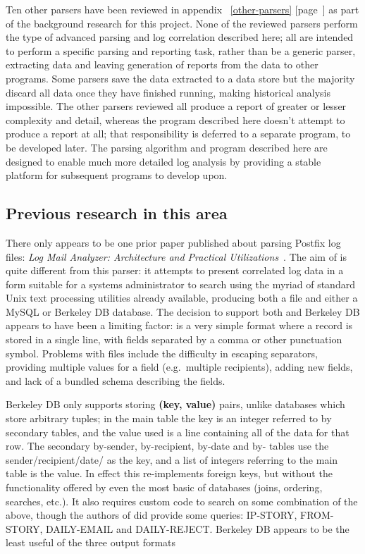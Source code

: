 \documentclass[a4paper,12pt,draft]{article}
\newcommand{\refwithpage}[1]{%
    \empty{}\ref{#1} [page~\pageref{#1}]%
}
\begin{document}
Ten other parsers have been reviewed in
appendix~\refwithpage{other-parsers} as part of the background research for
this project.  None of the reviewed parsers perform the type of advanced
parsing and log correlation described here; all are intended to perform a
specific parsing and reporting task, rather than be a generic parser,
extracting data and leaving generation of reports from the data to other
programs.  Some parsers save the data extracted to a data store but the
majority discard all data once they have finished running, making
historical analysis impossible.  The other parsers reviewed all produce a
report of greater or lesser complexity and detail, whereas the program
described here doesn't attempt to produce a report at all; that
responsibility is deferred to a separate program, to be developed later.
The parsing algorithm and program described here are designed to enable
much more detailed log analysis by providing a stable platform for
subsequent programs to develop upon.



\subsection{Previous research in this area}

\label{prior art}

There only appears to be one prior paper published about parsing Postfix
log files: \textit{Log Mail Analyzer: Architecture and Practical
Utilizations\/}~\cite{log-mail-analyser}.  The aim of \LMA{} is quite
different from this parser: it attempts to present correlated log data in a
form suitable for a systems administrator to search using the myriad of
standard Unix text processing utilities already available, producing both a
\CSV{} file and either a MySQL or Berkeley DB database.  The decision to
support both \CSV{} and Berkeley DB appears to have been a limiting factor:
\CSV{} is a very simple format where a record is stored in a single line,
with fields separated by a comma or other punctuation symbol.  Problems
with \CSV{} files include the difficulty in escaping separators, providing
multiple values for a field (e.g.\ multiple recipients), adding new fields,
and lack of a bundled schema describing the fields.

Berkeley DB only supports storing \textbf{(key, value)} pairs, unlike
\SQL{} databases which store arbitrary tuples; in the main table the key is
an integer referred to by secondary tables, and the value used is a \CSV{}
line containing all of the data for that row.  The secondary by-sender,
by-recipient, by-date and by-\IP{} tables use the
sender/recipient/date/\IP{} as the key, and a \CSV{} list of integers
referring to the main table is the value.  In effect this re-implements
\SQL{} foreign keys, but without the functionality offered by even the most
basic of \SQL{} databases (joins, ordering, searches, etc.).  It also
requires custom code to search on some combination of the above, though the
authors of \LMA{} did provide some queries: IP-STORY, FROM-STORY,
DAILY-EMAIL and DAILY-REJECT\@.  Berkeley DB appears to be the least useful
of the three output formats
\end{document}
